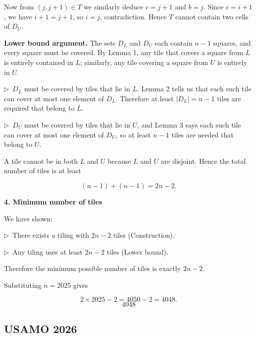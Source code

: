 \documentclass{llmxive}
\providecommand{\solutionheading}[1]{\par\smallskip\noindent\textbf{#1}\par}
\providecommand{\compactbullet}[1]{\par\noindent$\triangleright$~#1\par}
\begin{document}
Now from \((j,j+1) \in T\) we similarly deduce \(c = j+1\) and \(b = j\). Since \(c = i+1\), we have \(i+1 = j+1\), so \(i = j\), contradiction. Hence \(T\) cannot contain two cells of \(D_U\).\par
\textbf{Lower bound argument.} The sets \(D_L\) and \(D_U\) each contain \(n-1\) squares, and every square must be covered. By Lemma 1, any tile that covers a square from \(L\) is entirely contained in \(L\); similarly, any tile covering a square from \(U\) is entirely in \(U\).\par
\compactbullet{\(D_L\) must be covered by tiles that lie in \(L\). Lemma 2 tells us that each such tile can cover at most one element of \(D_L\). Therefore at least \(|D_L| = n-1\) tiles are required that belong to \(L\).}
\compactbullet{\(D_U\) must be covered by tiles that lie in \(U\), and Lemma 3 says each such tile can cover at most one element of \(D_U\), so at least \(n-1\) tiles are needed that belong to \(U\).}
A tile cannot be in both \(L\) and \(U\) because \(L\) and \(U\) are disjoint. Hence the total number of tiles is at least\par
\[
(n-1) + (n-1) = 2n-2.
\]
\smallskip
\solutionheading{4. Minimum number of tiles}
We have shown:\par
\compactbullet{There exists a tiling with \(2n-2\) tiles (Construction).}
\compactbullet{Any tiling uses at least \(2n-2\) tiles (Lower bound).}
Therefore the minimum possible number of tiles is exactly \(2n-2\).\par
Substituting \(n = 2025\) gives\par
\[
2 \times 2025 - 2 = 4050 - 2 = 4048.
\]
\[
\boxed{4048}
\]
\par


\subsection{USAMO 2026}
\vspace{1em}
\end{document}
